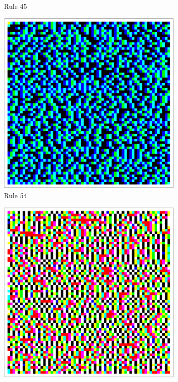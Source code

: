 \documentclass{article}
\begin{document}
\begin{figure}[H]
\begin{subfigure}[b]{0.135\textwidth}
        \vspace{-16pt}\caption*{Rule 45}
        \label{fig:rule-45-center_columns-4096}
    \end{subfigure}
    \begin{subfigure}[b]{0.135\textwidth}
        \centering
        \includegraphics[width=\textwidth]{graphics/behavior/center-columns/rule-54-center_columns-4096.pdf}
        \vspace{-16pt}\caption*{Rule 54}
        \label{fig:rule-54-center_columns-4096}
    \end{subfigure}
    \begin{subfigure}[b]{0.135\textwidth}
        \centering
        \includegraphics[width=\textwidth]{graphics/behavior/center-columns/rule-61-center_columns-4096.pdf}

\end{subfigure}
\end{figure}
\end{document}
